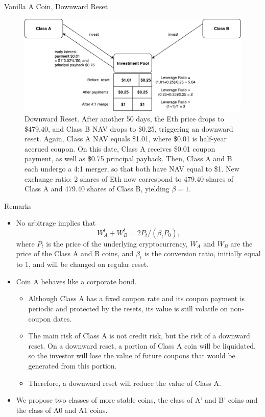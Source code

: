\documentclass[notes=show, beamer, handout]{beamer}
\begin{document}
\begin{frame}{Vanilla A Coin, Downward Reset}


\begin{figure}
\includegraphics[width=\textwidth]{downward.pdf}
\caption{\footnotesize Downward Reset. After another 50 days, the Eth price drops to \$479.40, and Class B NAV drops to \$0.25, triggering an downward reset. Again, Class A NAV equals \$1.01, where \$0.01 is half-year accrued coupon. On this date, Class A receives \$0.01 coupon payment, as well as \$0.75 principal payback. Then, Class A and B each undergo a 4:1 merger, so that both have NAV equal to \$1. New exchange ratio: 2 shares of Eth now correspond to 479.40 shares of Class A and 479.40 shares of Class B, yielding $\beta=1$.}
\end{figure}

\end{frame}

\begin{frame}{Remarks}

\begin{itemize}
  \small
\item No arbitrage implies that
$$W_A^t +W_B^t=2 P_t/(\beta_t P_0),$$
where $P_t$ is the price of the underlying cryptocurrency, $W_A$ and $W_B$ are the price of the Class A and B coins, and $\beta_t$ is the conversion ratio, initially equal to 1, and will be changed on regular reset.
\item Coin A behaves like a corporate bond.
\begin{itemize}
\item Although Class A has a fixed coupon rate and its coupon payment is periodic and protected by the resets, its value is still volatile on non-coupon dates.
\item The main risk of Class A is not credit risk, but the risk of a downward reset. On a downward reset, a portion of Class A coin will be liquidated, so the investor will lose the value of future coupons that would be generated from this portion.
\item Therefore, a downward reset will reduce the value of Class A.
\end{itemize}
\item We propose two classes of more stable coins, the class of A' and B' coins and the class of A0 and A1 coins.
\end{itemize}
\end{frame}
\end{document}
